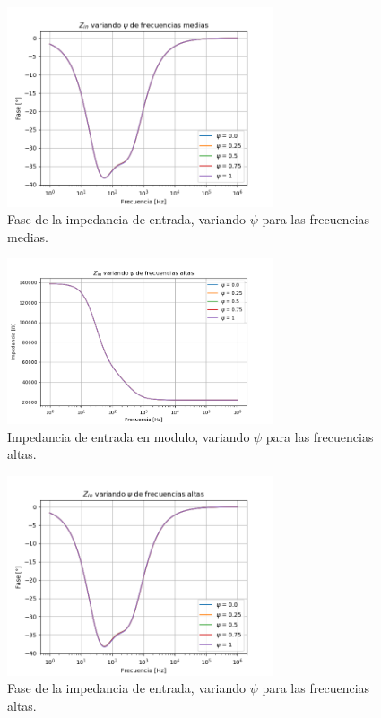 \begin{figure}[H]
\centering
	\includegraphics[width=0.7\textwidth, trim = {0 0 0 1.35cm}, clip]{Imagenes/Zin-Med-Ph.png}
	\caption{Fase de la impedancia de entrada, variando $\psi$ para las frecuencias medias.}
	\label{fig:zin_ph_med}
\end{figure}
\begin{figure}[H]
\centering
	\includegraphics[width=0.7\textwidth, trim = {0 0 0 1.35cm}, clip]{Imagenes/Zin-High-Mod.png}
	\caption{Impedancia de entrada en modulo, variando $\psi$ para las frecuencias altas.}
	\label{fig:zin_modulo_high}
\end{figure}
\begin{figure}[H]
\centering
	\includegraphics[width=0.7\textwidth, trim = {0 0 0 1.35cm}, clip]{Imagenes/Zin-High-Ph.png}
	\caption{Fase de la impedancia de entrada, variando $\psi$ para las frecuencias altas.}
	\label{fig:zin_ph_high}
\end{figure}

